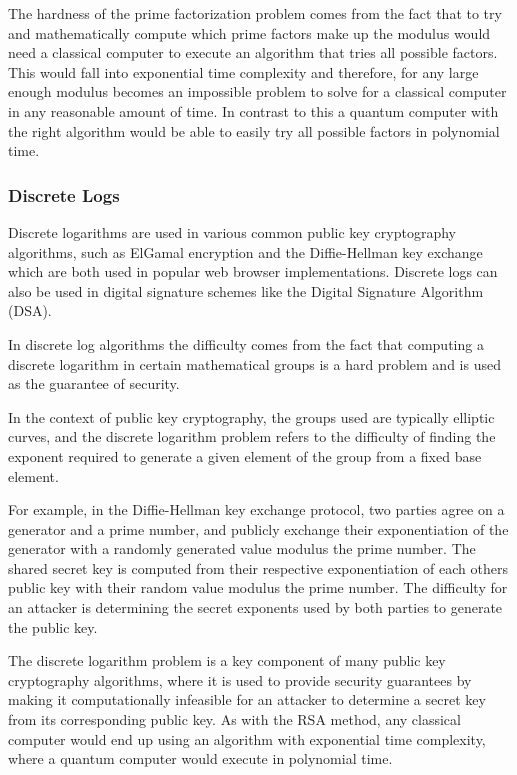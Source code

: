 \documentclass{article}
\begin{document}
The hardness of the prime factorization problem comes from the fact that to try and mathematically compute which prime factors make up the modulus would need a classical computer to execute an algorithm that tries all possible factors. This would fall into exponential time complexity and therefore, for any large enough modulus becomes an impossible problem to solve for a classical computer in any reasonable amount of time.  In contrast to this a quantum computer with the right algorithm would be able to easily try all possible factors in polynomial time.

\subsubsection{Discrete Logs}
Discrete logarithms are used in various common public key cryptography algorithms, such as ElGamal encryption and the Diffie-Hellman key exchange which are both used in popular web browser implementations. Discrete logs can also be used in  digital signature schemes like the Digital Signature Algorithm (DSA).

In discrete log algorithms the difficulty comes from the fact that computing a discrete logarithm in certain mathematical groups is a hard problem and is used as the guarantee of security.

In the context of public key cryptography, the groups used are typically elliptic curves, and the discrete logarithm problem refers to the difficulty of finding the exponent required to generate a given element of the group from a fixed base element.

For example, in the Diffie-Hellman key exchange protocol, two parties agree on a generator and a prime number, and publicly exchange their exponentiation of the generator with a randomly generated value modulus the prime number. The shared secret key is computed from their respective exponentiation of each others public key with their random value modulus the prime number. The difficulty for an attacker is determining the secret exponents used by both parties to generate the public key.

The discrete logarithm problem is a key component of many public key cryptography algorithms, where it is used to provide security guarantees by making it computationally infeasible for an attacker to determine a secret key from its corresponding public key. As with the RSA method, any classical computer would end up using an algorithm with exponential time complexity, where a quantum computer would execute in polynomial time.
\end{document}
